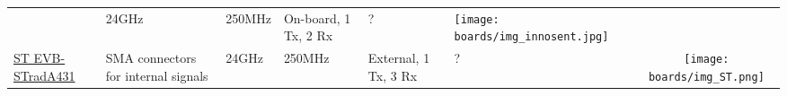 \begin{longtable}[]{@{}llllllc@{}}
\begin{minipage}[t]{\colwidthB}
\strut\end{minipage} &
\begin{minipage}[t]{\colwidthC}\raggedright\strut
24GHz
\strut\end{minipage} &
\begin{minipage}[t]{\colwidthD}\raggedright\strut
250MHz
\strut\end{minipage} &
\begin{minipage}[t]{\colwidthE}\raggedright\strut
On-board, 1 Tx, 2 Rx
\strut\end{minipage} &
\begin{minipage}[t]{\colwidthF}\raggedright\strut
?
\strut\end{minipage} &
\begin{minipage}[t]{\colwidthG}\centering\strut
\texttt{[image: boards/img\_innosent.jpg]}
\strut\end{minipage}\tabularnewline

\begin{minipage}[t]{\colwidthA}\raggedright\strut
	\href{http://www.st.com/content/st_com/en/products/evaluation-tools/product-evaluation-tools/automotive-ic-eval-boards/evb-strada431.html}{ST EVB-STradA431}
\strut\end{minipage} &
\begin{minipage}[t]{\colwidthB}\raggedright\strut
SMA connectors for internal signals
\strut\end{minipage} &
\begin{minipage}[t]{\colwidthC}\raggedright\strut
24GHz
\strut\end{minipage} &
\begin{minipage}[t]{\colwidthD}\raggedright\strut
250MHz
\strut\end{minipage} &
\begin{minipage}[t]{\colwidthE}\raggedright\strut
External, 1 Tx, 3 Rx
\strut\end{minipage} &
\begin{minipage}[t]{\colwidthF}\raggedright\strut
?
\strut\end{minipage} &
\begin{minipage}[t]{\colwidthG}\centering\strut
\texttt{[image: boards/img\_ST.png]}
\strut\end{minipage}\tabularnewline


\end{longtable}
